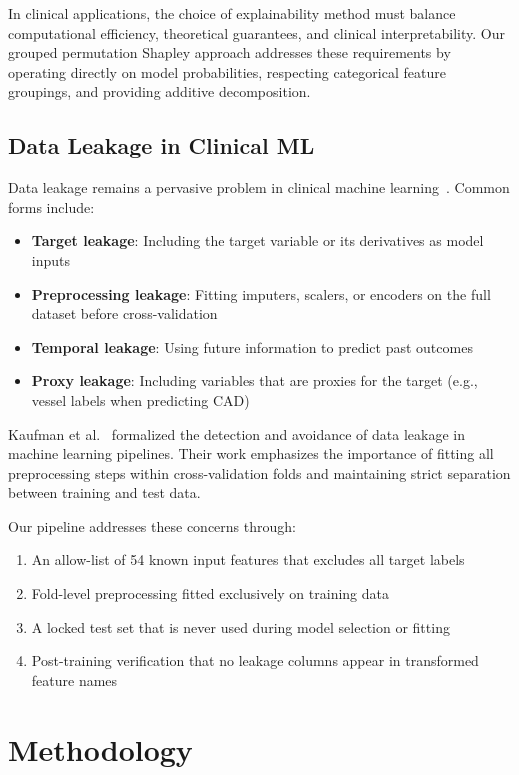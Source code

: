 \documentclass[conference]{IEEEtran}
\begin{document}
In clinical applications, the choice of explainability method must balance computational efficiency, theoretical guarantees, and clinical interpretability. Our grouped permutation Shapley approach addresses these requirements by operating directly on model probabilities, respecting categorical feature groupings, and providing additive decomposition.

\subsection{Data Leakage in Clinical ML}

Data leakage remains a pervasive problem in clinical machine learning~\cite{kaufman2020}. Common forms include:

\begin{itemize}
    \item \textbf{Target leakage}: Including the target variable or its derivatives as model inputs
    \item \textbf{Preprocessing leakage}: Fitting imputers, scalers, or encoders on the full dataset before cross-validation
    \item \textbf{Temporal leakage}: Using future information to predict past outcomes
    \item \textbf{Proxy leakage}: Including variables that are proxies for the target (e.g., vessel labels when predicting CAD)
\end{itemize}

Kaufman et al.~\cite{kaufman2020} formalized the detection and avoidance of data leakage in machine learning pipelines. Their work emphasizes the importance of fitting all preprocessing steps within cross-validation folds and maintaining strict separation between training and test data.

Our pipeline addresses these concerns through:
\begin{enumerate}
    \item An allow-list of 54 known input features that excludes all target labels
    \item Fold-level preprocessing fitted exclusively on training data
    \item A locked test set that is never used during model selection or fitting
    \item Post-training verification that no leakage columns appear in transformed feature names
\end{enumerate}

\section{Methodology}
\end{document}
